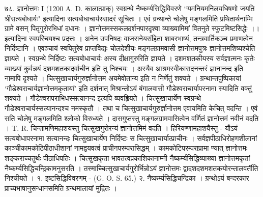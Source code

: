७८. ज्ञानोत्तमः I (1200 A. D. कालात्प्राक्‌)
स्वग्रन्थे नैष्कर्म्यसिद्धिविवरणे ``यमनियमनिलयधिषणो जयति श्रीसत्यबोधार्यः" इत्यादिना सत्यबोधाचार्यस्सादरं सूचितः । एवं ग्रन्थान्ते
चोलेषु मङ्गलमिति प्रथितार्थनाम्मि ग्रामे वसन् पितृगुरोरभिधां दधानः । ज्ञानोत्तमस्सकलदर्शनपारदृश्वा व्याख्यामिमां वितनुते स्फुटमिष्टसिद्धेः ।।
इत्यादिना स्वपरिचयश्च प्रदत्तः । अनेन उपनिषदः वाजसनेयसंहिता शाबरभाष्यं, तन्त्रवार्तिकञ्च प्रमाणत्वेन निर्दिष्टानि । एवञ्चायं स्वपितुरेव प्राप्तविद्यः चोलदेशीयः मङ्गलग्रामवासी ज्ञानोत्तमपुत्रः ज्ञानोत्तमशिष्यश्चेति ज्ञायते । स्वग्रन्थे निर्दिष्टः सत्यबोधाचार्यः अस्य दीक्षागुरुरिति ज्ञायते । दशमशतकीयस्य सर्वज्ञात्मनः कृतेः व्याख्यां कुर्वन्नयं दशमशतकादर्वाचीन इति तु निश्चयः । अस्यैव आश्रमस्वीकारादनन्तरं ज्ञानानन्द इति नामापि दृश्यते ।
चित्सुखाचार्यगुरुर्ज्ञानोत्तम अयमेवोतान्य इति न निर्णेतुं शक्यते । ग्रन्थान्तपुष्पिकायां `गौडेश्वराचार्यज्ञानोत्तमकृतायां' इति दर्शनात् मिश्रान्तोऽयं बंगालवासी गौडेश्वराचार्यापरनामा स्यादिति वक्तुं शक्यते । गौडेश्वरापराभिधस्सत्यानन्द इत्यपि व्यवहृियते । चित्सुखाचार्येण स्वग्रन्थे गौडेश्वराचार्यस्सत्यानन्दश्च नमस्कृतौ । तथा च चित्सुखाचार्यगुरुर्ज्ञानोत्तम एवायमिति केचित् वदन्ति । एवं सति चोलेषु मङ्गलमिति श्लोको विरुध्यते ।
दासगुप्तस्तु मङ्गलग्रामवासित्वेन वर्णितं ज्ञानोत्तमं नवीनं वदति । T. R. चिन्तामणिमहाशयस्तु चित्सुखगुरोरन्यं ज्ञानोत्तमिमं वदति ।
हिरियण्णामहाशयैस्तु - यौऽयं सत्यबोधापरनामा सत्यानन्दः चित्सुखाचार्येण निर्दिष्टः स चित्सुखाचार्यात्प्राचीनः । सर्वज्ञपीठाधिरोहणशीलानां काञ्चीकामकोठिपीठाधीशानां नामद्वयवत्वं प्राचीनपरम्परासिद्धम् । कामकोटिपरम्पराप्रामा ण्यात् ज्ञानोत्तमः शङ्कराच्चतुर्थः पीठाधिपतिः । चित्सुखकृता भावतत्वप्रकाशिकानाम्नी नैष्कर्म्यसिद्धिव्याख्या ज्ञानोत्तमकृतां नैष्कर्म्यसिद्धिचन्द्रिकामनुसरति । तस्माच्चित्सुखाचार्यगुरोर्भिन्नोऽयं ज्ञानोत्तमः द्वादशदशमशतकयोरन्तालवर्तीति निश्चीयते ।
१. इष्टसिद्धिविवरणम् - (G. O. S. 65.)
२. नैष्कर्म्यसिद्धिचन्द्रिका । ग्रन्थोऽयं बन्दरकार प्राच्यभाषानुसन्धानसमिति ग्रन्थमालायां मुद्रितः ।


